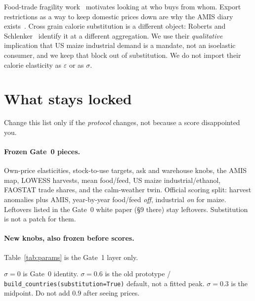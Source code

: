 \documentclass[11pt,a4paper]{article}
\begin{document}
Food-trade fragility work~\citep{puma2015} motivates looking at who buys
from whom. Export restrictions as a way to keep domestic prices down are
why the AMIS diary exists~\citep{headey2011,martin2012,wright2011}. Cross
grain calorie substitution is a different object: Roberts and
Schlenker~\citep{roberts2013} identify it at a different aggregation. We
use their \emph{qualitative} implication that US maize industrial demand is
a mandate, not an isoelastic consumer, and we keep that block out of
substitution. We do not import their calorie elasticity as
\(\varepsilon\) or as \(\sigma\).

\section{What stays locked}
\label{sec:locked}

Change this list only if the \emph{protocol} changes, not because a score
disappointed you.

\paragraph{Frozen Gate~0 pieces.}
Own-price elasticities, stock-to-use targets, ask and warehouse knobs, the
AMIS map, LOWESS harvests, mean food/feed, US maize industrial/ethanol,
FAOSTAT trade shares, and the calm-weather twin. Official scoring split:
harvest anomalies plus AMIS, year-by-year food/feed \emph{off}, industrial
\emph{on} for maize. Leftovers listed in the Gate~0 white paper
(\S9 there) stay leftovers. Substitution is not a patch for them.

\paragraph{New knobs, also frozen before scores.}
Table~\ref{tab:params} is the Gate~1 layer only.

\begin{table}[H]
\centering
\caption{Gate~1 defaults. \(\sigma\) is a band, not a fit. \(\rho\) is
illustrative structure, not estimated on 2008. Own \(\varepsilon\) is
Gate~0, not \texttt{OWN\_ELAST}.}
\label{tab:params}
\small

\end{table}

\(\sigma=0\) is Gate~0 identity. \(\sigma=0.6\) is the old prototype /
\texttt{build\_countries(substitution=True)} default, not a fitted peak.
\(\sigma=0.3\) is the midpoint. Do not add \(0.9\) after seeing prices.
\end{document}
